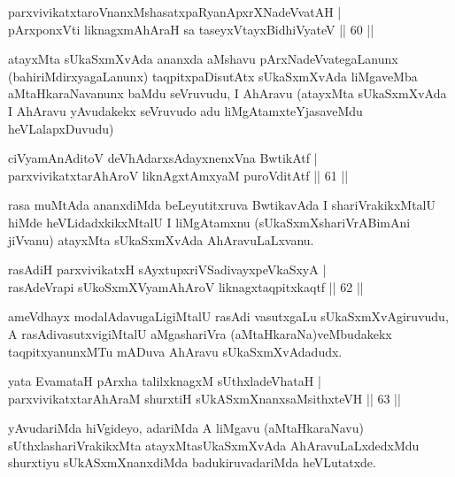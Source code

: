\begin{shl}
parxvivikatxtaroV\s nanxMshasatxpaRyanApxrXNadeVvatAH |\\
pArxponxVti liknagxmAhAraH sa taseyxVtayxBidhiVyateV \hfill || 60 || 
\end{shl}

\begin{artha}
atayxMta sUkaSxmXvAda ananxda aMshavu pArxNadeVvategaLanunx (bahiriMdirxyagaLanunx) taqpitxpaDisutAtx sUkaSxmXvAda liMgaveMba aMtaHkaraNavanunx baMdu seVruvudu, I AhAravu (atayxMta sUkaSxmXvAda I AhAravu yAvudakekx seVruvudo adu liMgAtamxteYjasaveMdu heVLalapxDuvudu)
\end{artha}

\begin{shl}
ciVyamAnAditoV deVhAdarxsAdayxnenxVna BwtikAtf |\\
parxvivikatxtarAhAroV liknAgxtAmx\s yaM puroVditAtf \hfill || 61 || 
\end{shl}

\begin{artha}
rasa muMtAda ananxdiMda beLeyutitxruva BwtikavAda I shariVrakikxMtalU hiMde heVLidadxkikxMtalU I liMgAtamxnu (sUkaSxmXshariVrABimAni jiVvanu) atayxMta sUkaSxmXvAda AhAravuLaLxvanu.
\end{artha}


\begin{shl}
rasAdiH parxvivikatxH sAyxtupxriVSadivayxpeVkaSxyA |\\
rasAdeVrapi sUkoSxmXV\s yamAhAroV liknagxtaqpitxkaqtf \hfill || 62 || 
\end{shl}

\begin{artha}
ameVdhayx modalAdavugaLigiMtalU rasAdi vasutxgaLu sUkaSxmXvAgiruvudu, A rasAdivasutxvigiMtalU aMgashariVra (aMtaHkaraNa)veMbudakekx taqpitxyanunxMTu mADuva AhAravu sUkaSxmXvAdadudx.
\end{artha}

\begin{shl}
yata EvamataH pArxha talilxknagxM sUthxladeVhataH |\\
parxvivikatxtarAhAraM shurxtiH sUkASxmXnanxsaMsithxteVH \hfill || 63 || 
\end{shl}

\begin{artha}
yAvudariMda hiVgideyo, adariMda A liMgavu (aMtaHkaraNavu) sUthxlashariVrakikxMta atayxMtasUkaSxmXvAda AhAravuLaLxdedxMdu shurxtiyu sUkASxmXnanxdiMda badukiruvadariMda heVLutatxde.
\end{artha}

